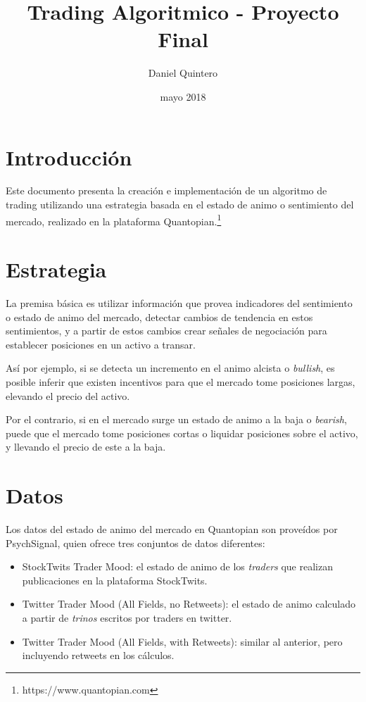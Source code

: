 \documentclass[a4paper, 11pt, twocolumn]{article}
\title{Trading Algoritmico - Proyecto Final}
\author{Daniel Quintero}
\date{mayo 2018}
\begin{document}
\maketitle

\section{Introducción}
Este documento presenta la creación e implementación de un algoritmo de trading utilizando una estrategia basada en el estado de animo o sentimiento del mercado, realizado en la plataforma Quantopian.\footnote{https://www.quantopian.com}

\section{Estrategia}
La premisa básica es utilizar información que provea indicadores del sentimiento o estado de animo del mercado, detectar cambios de tendencia en estos sentimientos, y a partir de estos cambios crear señales de negociación para establecer posiciones en un activo a transar.

Así por ejemplo, si se detecta un incremento en el animo alcista o \textit{bullish}, es posible inferir que existen incentivos para que el mercado tome posiciones largas, elevando el precio del activo.

Por el contrario, si en el mercado surge un estado de animo a la baja o \textit{bearish}, puede que el mercado tome posiciones cortas o liquidar posiciones sobre el activo, y llevando el precio de este a la baja.

\section{Datos}
Los datos del estado de animo del mercado en Quantopian son proveídos por PsychSignal, quien ofrece tres conjuntos de datos diferentes:

\begin{itemize}
    \item StockTwits Trader Mood: el estado de animo de los \textit{traders} que realizan publicaciones en la plataforma StockTwits.
    \item Twitter Trader Mood (All Fields, no Retweets): el estado de animo calculado a partir de \textit{trinos} escritos por traders en twitter.
    \item Twitter Trader Mood (All Fields, with Retweets): similar al anterior, pero incluyendo retweets en los cálculos.
\end{itemize}
\end{document}
